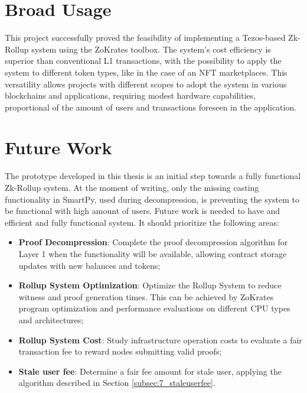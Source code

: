 \section{Broad Usage\label{sec:dissemination}}

This project successfully proved the feasibility of implementing a Tezos-based Zk-Rollup system using the ZoKrates toolbox. The system's cost efficiency is superior than conventional L1 transactions, with the possibility to apply the system to different token types, like in the case of an NFT marketplaces. This versatility allows projects with different scopes to adopt the system in various blockchains and applications, requiring modest hardware capabilities, proportional of the amount of users and transactions foreseen in the application.

\section{Future Work}

The prototype developed in this thesis is an initial step towards a fully functional Zk-Rollup system. At the moment of writing, only the missing casting functionality in SmartPy, used during decompression, is preventing the system to be functional with high amount of users. Future work is needed to have and efficient and fully functional system. It should prioritize the following areas:
\vspace{-0.11in}
\begin{itemize}
	\item \textbf{Proof Decompression}: Complete the proof decompression algorithm for Layer 1 when the functionality will be available, allowing contract storage updates with new balances and tokens;
	      \vspace{-0.11in}
	\item \textbf{Rollup System Optimization}: Optimize the Rollup System to reduce witness and proof generation times. This can be achieved by ZoKrates program optimization and performance evaluations on different CPU types and architectures;
	      \vspace{-0.11in}
	\item \textbf{Rollup System Cost}: Study infrastructure operation costs to evaluate a fair transaction fee to reward nodes submitting valid proofs;
	      \vspace{-0.11in}
	\item \textbf{Stale user fee}: Determine a fair fee amount for stale user, applying the algorithm described in Section \ref{subsec:7_staleuserfee}.
	\vspace{-0.11in}
\end{itemize}
